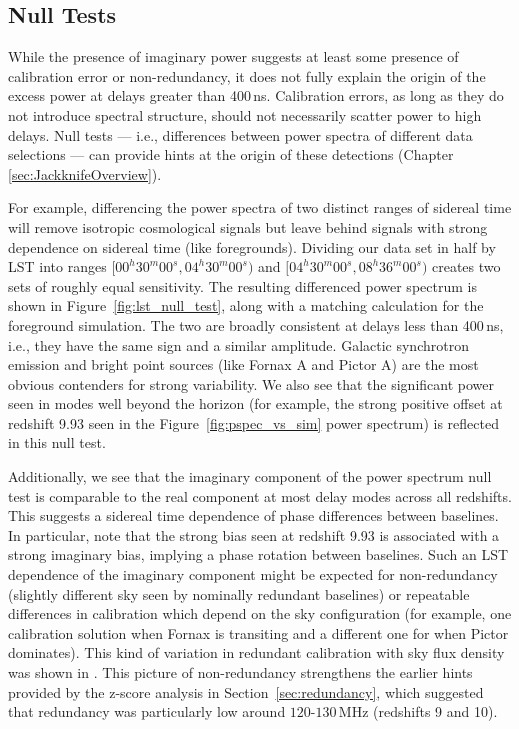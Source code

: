 \subsection{Null Tests}\label{sec:nulls}

While the presence of imaginary power suggests at least some presence of calibration error or non-redundancy, it does not fully explain the origin of the excess power at delays greater than 400\,ns. Calibration errors, as long as they do not introduce
spectral structure, should not necessarily scatter power to high delays. Null tests --- i.e., differences between
power spectra of different data selections --- can provide hints at the origin of these detections (Chapter \ref{sec:JackknifeOverview}).

For example, differencing the power spectra of two distinct ranges of sidereal time will remove
isotropic cosmological signals but leave behind signals with strong dependence on sidereal time (like foregrounds).
Dividing our data set in half by LST into ranges $ [00^{h}30^{m}00^{s}, 04^{h}30^{m}00^{s}) $
and $ [04^{h}30^{m}00^{s}, 08^{h}36^{m}00^{s}) $ creates two sets of roughly equal sensitivity.
The resulting differenced power spectrum is shown in Figure~\ref{fig:lst_null_test}, along with a matching calculation for the foreground simulation.
The two are broadly consistent at
delays less than 400\,ns, i.e., they have the same sign and a
similar amplitude. Galactic synchrotron emission and bright point sources (like Fornax A
and Pictor A) are the most obvious contenders for strong variability. We also see that the significant power seen in modes well beyond the horizon (for example, the strong positive offset at redshift 9.93 seen in the Figure~\ref{fig:pspec_vs_sim} power spectrum) is reflected in this null test.

Additionally, we see that the imaginary component of the power spectrum null test is comparable to the real component at most delay modes across all redshifts. 
This suggests a sidereal time dependence of phase differences between baselines. In particular, note that the strong bias seen at redshift 9.93 is associated with a strong imaginary bias, implying a phase rotation between baselines. Such an LST dependence of the imaginary component might be expected for non-redundancy (slightly different sky seen by nominally redundant baselines) or repeatable differences in calibration which depend on the sky configuration (for example, one calibration solution when Fornax is transiting and a different one for when Pictor dominates). This kind of variation in redundant calibration with sky flux density was shown in \citet{joseph_et_al2018}. This picture of non-redundancy strengthens the earlier hints provided by the z-score analysis in Section~\ref{sec:redundancy}, which suggested that redundancy was particularly low around $120$-$130$\,MHz (redshifts 9 and 10).

